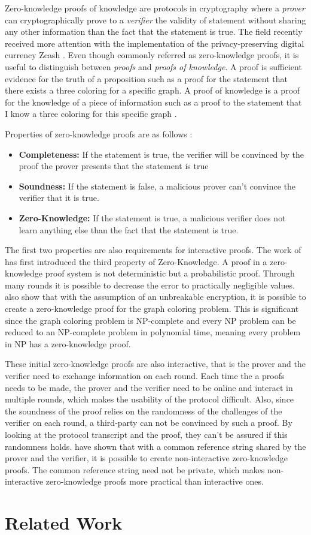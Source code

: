 Zero-knowledge proofs of knowledge are protocols in cryptography where a \textit{prover} can cryptographically prove to a \textit{verifier} the validity of statement without sharing any other information than the fact that the statement is true. The field recently received more attention with the implementation of the privacy-preserving digital currency Zcash \parencite{E.BenSasson.2016}. Even though commonly referred as zero-knowledge proofs, it is useful to distinguish between \textit{proofs} and \textit{proofs of knowledge}. A proof is sufficient evidence for the truth of a proposition such as a proof for the statement that there exists a three coloring for a specific graph. A proof of knowledge is a proof for the knowledge of a piece of information such as a proof to the statement that I know a three coloring for this specific graph \parencite{green_2017}. 

Properties of zero-knowledge proofs are as follows \parencite{Groth.2010}:
\begin{itemize}
  \item \textbf{Completeness:} If the statement is true, the verifier will be convinced by the proof the prover presents that the statement is true
  \item \textbf{Soundness:} If the statement is false, a malicious prover can't convince the verifier that it is true.
  \item \textbf{Zero-Knowledge:} If the statement is true, a malicious verifier does not learn anything else than the fact that the statement is true.
\end{itemize}

The first two properties are also requirements for interactive proofs. The work of \cite{Goldwasser.1985} has first introduced the third property of Zero-Knowledge. A proof in a zero-knowledge proof system is not deterministic but a probabilistic proof. Through many rounds it is possible to decrease the error to practically negligible values. \cite{Goldreich.1991} also show that with the assumption of an unbreakable encryption, it is possible to create a zero-knowledge proof for the graph coloring problem. This is significant since the graph coloring problem is NP-complete and every NP problem can be reduced to an NP-complete problem in polynomial time, meaning every problem in NP has a zero-knowledge proof. 

These initial zero-knowledge proofs are also interactive, that is the prover and the verifier need to exchange information on each round. Each time the a proofs needs to be made, the prover and the verifier need to be online and interact in multiple rounds, which makes the usability of the protocol difficult. Also, since the soundness of the proof relies on the randomness of the challenges of the verifier on each round, a third-party can not be convinced by such a proof. By looking at the protocol transcript and the proof, they can't be assured if this randomness holds. \cite{Blum.1988} have shown that with a common reference string shared by the prover and the verifier, it is possible to create non-interactive zero-knowledge proofs. The common reference string need not be private, which makes non-interactive zero-knowledge proofs more practical than interactive ones.

\section{Related Work}
